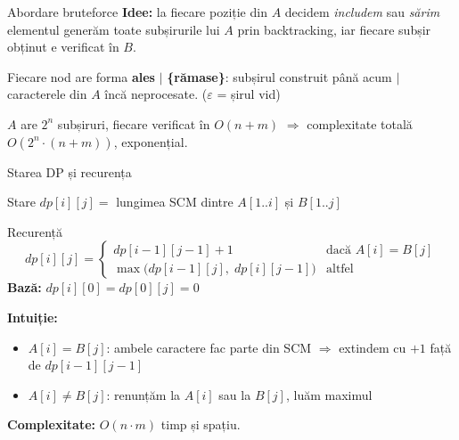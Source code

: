 \documentclass[10pt]{beamer}
\begin{document}
\begin{frame}{Abordare bruteforce}
  \textbf{Idee:} la fiecare poziție din $A$ decidem \textit{includem} sau \textit{sărim}
  elementul \textemdash{} generăm toate subșirurile lui $A$ prin backtracking,
  iar fiecare subșir obținut e verificat în $B$.
  \smallskip

  Fiecare nod are forma \textbf{ales} $|$ \textbf{\{rămase\}}:
  subșirul construit până acum $|$ caracterele din $A$ încă neprocesate.
  ($\varepsilon$ = șirul vid)
  \smallskip
  \begin{center}
  \end{center}
  \smallskip
  $A$ are $2^n$ subșiruri, fiecare verificat în $O(n + m)$
  $\Rightarrow$ complexitate totală $O(2^n \cdot (n + m))$, exponențial.
\end{frame}

\begin{frame}{Starea DP și recurența}
  \begin{block}{Stare}
    $dp[i][j] = $ lungimea SCM dintre $A[1..i]$ și $B[1..j]$
  \end{block}
  \begin{block}{Recurență}
    \[
      dp[i][j] = \begin{cases}
        dp[i-1][j-1] + 1 & \text{dacă } A[i] = B[j] \\
        \max\bigl(dp[i-1][j],\; dp[i][j-1]\bigr) & \text{altfel}
      \end{cases}
    \]
    \textbf{Bază:} $dp[i][0] = dp[0][j] = 0$
  \end{block}
  \smallskip
  \textbf{Intuiție:}
  \begin{itemize}\itemsep2pt
    \item $A[i] = B[j]$: ambele caractere fac parte din SCM $\Rightarrow$ extindem cu $+1$
      față de $dp[i-1][j-1]$
    \item $A[i] \neq B[j]$: renunțăm la $A[i]$ sau la $B[j]$, luăm maximul
  \end{itemize}
  \textbf{Complexitate:} $O(n \cdot m)$ timp și spațiu.
\end{frame}
\end{document}
